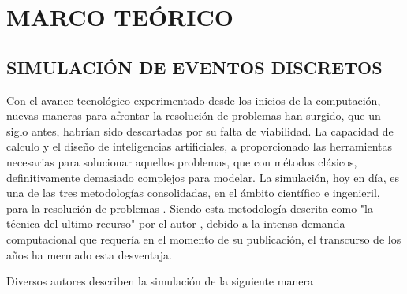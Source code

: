 
\section{MARCO TEÓRICO}

\subsection{SIMULACIÓN DE EVENTOS DISCRETOS}

Con el avance tecnológico experimentado desde los inicios de la computación,
nuevas maneras para afrontar la resolución de problemas han surgido,
que un siglo antes, habrían sido descartadas por su falta de viabilidad.
La capacidad de calculo y el diseño de inteligencias artificiales,
a proporcionado las herramientas necesarias
para solucionar aquellos problemas, que con métodos clásicos,
definitivamente demasiado complejos para modelar.
La simulación, hoy en día, es una de las tres metodologías consolidadas,
en el ámbito científico e ingenieril,
para la resolución de problemas \citep{banks1998handbook}.
Siendo esta metodología descrita como "la técnica del ultimo recurso"
por el autor \citep{garzia1986discrete},
debido a la intensa demanda computacional
que requería en el momento de su publicación,
el transcurso de los años ha mermado esta desventaja.

Diversos autores describen la simulación de la siguiente manera

